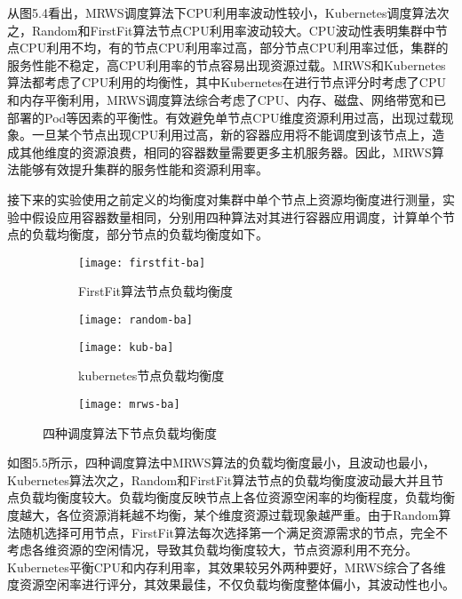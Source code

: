 从图5.4看出，MRWS调度算法下CPU利用率波动性较小，Kubernetes调度算法次之，Random和FirstFit算法节点CPU利用率波动较大。CPU波动性表明集群中节点CPU利用不均，有的节点CPU利用率过高，部分节点CPU利用率过低，集群的服务性能不稳定，高CPU利用率的节点容易出现资源过载。MRWS和Kubernetes算法都考虑了CPU利用的均衡性，其中Kubernetes在进行节点评分时考虑了CPU和内存平衡利用，MRWS调度算法综合考虑了CPU、内存、磁盘、网络带宽和已部署的Pod等因素的平衡性。有效避免单节点CPU维度资源利用过高，出现过载现象。一旦某个节点出现CPU利用过高，新的容器应用将不能调度到该节点上，造成其他维度的资源浪费，相同的容器数量需要更多主机服务器。因此，MRWS算法能够有效提升集群的服务性能和资源利用率。

接下来的实验使用之前定义的均衡度对集群中单个节点上资源均衡度进行测量，实验中假设应用容器数量相同，分别用四种算法对其进行容器应用调度，计算单个节点的负载均衡度，部分节点的负载均衡度如下。

\begin{figure}[H]
	\centering%
	\begin{subfigure}{7cm}
		\texttt{[image: firstfit-ba]}
		\caption{FirstFit算法节点负载均衡度}
	\end{subfigure}%
	\hspace{0.5cm}%
	\begin{subfigure}{7cm}
		\texttt{[image: random-ba]}
	\end{subfigure}
	\begin{subfigure}{7cm}
		\texttt{[image: kub-ba]}
		\caption{kubernetes节点负载均衡度}
	\end{subfigure}%
	\hspace{0.5cm}%
	\begin{subfigure}{7cm}
		\texttt{[image: mrws-ba]}
	\end{subfigure}
	\caption{四种调度算法下节点负载均衡度}
	
\end{figure}

如图5.5所示，四种调度算法中MRWS算法的负载均衡度最小，且波动也最小，Kubernetes算法次之，Random和FirstFit算法节点的负载均衡度波动最大并且节点负载均衡度较大。负载均衡度反映节点上各位资源空闲率的均衡程度，负载均衡度越大，各位资源消耗越不均衡，某个维度资源过载现象越严重。由于Random算法随机选择可用节点，FirstFit算法每次选择第一个满足资源需求的节点，完全不考虑各维资源的空闲情况，导致其负载均衡度较大，节点资源利用不充分。Kubernetes平衡CPU和内存利用率，其效果较另外两种要好，MRWS综合了各维度资源空闲率进行评分，其效果最佳，不仅负载均衡度整体偏小，其波动性也小。

